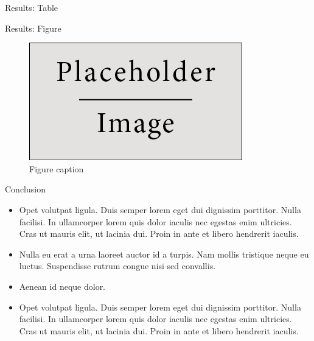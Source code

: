 \documentclass[final,hyperref={pdfpagelabels=false}]{beamer}
\begin{document}
\begin{frame}[t]
\begin{columns}[t]
\begin{column}{.465\textwidth}
\begin{block}{Results: Table}
\end{block}


\begin{block}{Results: Figure}

\begin{figure}
\includegraphics[width=0.8\linewidth]{placeholder.jpg}
\caption{Figure caption}
\end{figure}

\end{block}


\begin{block}{Conclusion}

\begin{itemize}
\item Opet volutpat ligula. Duis semper lorem eget dui dignissim porttitor. Nulla facilisi. In ullamcorper lorem quis dolor iaculis nec egestas enim ultricies. Cras ut mauris elit, ut lacinia dui. Proin in ante et libero hendrerit iaculis.
\item Nulla eu erat a urna laoreet auctor id a turpis. Nam mollis tristique neque eu luctus. Suspendisse rutrum congue nisi sed convallis. 
\item Aenean id neque dolor.
\item Opet volutpat ligula. Duis semper lorem eget dui dignissim porttitor. Nulla facilisi. In ullamcorper lorem quis dolor iaculis nec egestas enim ultricies. Cras ut mauris elit, ut lacinia dui. Proin in ante et libero hendrerit iaculis.
\end{itemize}

\end{block}



\end{column}
\end{columns}
\end{frame}
\end{document}
